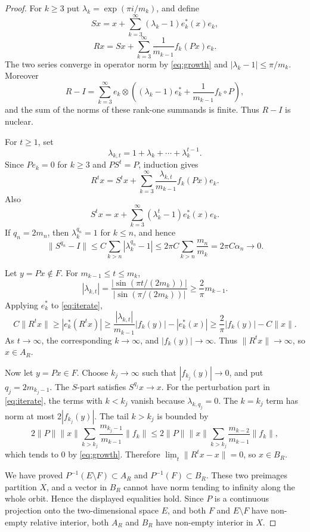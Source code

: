 \documentclass[11pt]{article}
\newcommand{\liminfn}{\underline{\lim}}
\begin{document}
\begin{proof}
For \(k\ge 3\) put \(\lambda_k=\exp(\pi i/m_k)\), and define
\[
  Sx=x+\sum_{k=3}^\infty (\lambda_k-1)e_k^*(x)e_k,
\]
\[
  Rx=Sx+\sum_{k=3}^\infty \frac{1}{m_{k-1}}f_k(Px)e_k .
\]
The two series converge in operator norm by \eqref{eq:growth} and
\(|\lambda_k-1|\le \pi/m_k\).  Moreover
\[
  R-I=\sum_{k=3}^\infty
  e_k\otimes\left((\lambda_k-1)e_k^*+\frac{1}{m_{k-1}}f_k\circ P\right),
\]
and the sum of the norms of these rank-one summands is finite.  Thus
\(R-I\) is nuclear.

For \(t\ge 1\), set
\[
  \lambda_{k,t}=1+\lambda_k+\cdots+\lambda_k^{t-1}.
\]
Since \(Pe_k=0\) for \(k\ge 3\) and \(PS^t=P\), induction gives
\begin{equation}\label{eq:iterate}
  R^t x=S^t x+\sum_{k=3}^\infty
        \frac{\lambda_{k,t}}{m_{k-1}}f_k(Px)e_k .
\end{equation}
Also
\[
  S^t x=x+\sum_{k=3}^\infty(\lambda_k^t-1)e_k^*(x)e_k .
\]
If \(q_n=2m_n\), then \(\lambda_k^{q_n}=1\) for \(k\le n\), and hence
\[
  \|S^{q_n}-I\|
  \le C\sum_{k>n}|\lambda_k^{q_n}-1|
  \le 2\pi C\sum_{k>n}\frac{m_n}{m_k}
  =2\pi C\alpha_n\to0 .
\]

Let \(y=Px\notin F\).  For \(m_{k-1}\le t\le m_k\),
\[
  |\lambda_{k,t}|
  =\frac{|\sin(\pi t/(2m_k))|}{|\sin(\pi/(2m_k))|}
  \ge \frac{2}{\pi}m_{k-1}.
\]
Applying \(e_k^*\) to \eqref{eq:iterate},
\[
  C\|R^t x\|
  \ge |e_k^*(R^t x)|
  \ge \frac{|\lambda_{k,t}|}{m_{k-1}}|f_k(y)|-|e_k^*(x)|
  \ge \frac{2}{\pi}|f_k(y)|-C\|x\|.
\]
As \(t\to\infty\), the corresponding \(k\to\infty\), and
\(|f_k(y)|\to\infty\).  Thus \(\|R^t x\|\to\infty\), so \(x\in A_R\).

Now let \(y=Px\in F\).  Choose \(k_j\to\infty\) such that
\(|f_{k_j}(y)|\to0\), and put \(q_j=2m_{k_j-1}\).  The \(S\)-part satisfies
\(S^{q_j}x\to x\).  For the perturbation part in \eqref{eq:iterate}, the
terms with \(k<k_j\) vanish because \(\lambda_{k,q_j}=0\).  The \(k=k_j\)
term has norm at most \(2|f_{k_j}(y)|\).  The tail \(k>k_j\) is bounded by
\[
  2\|P\|\|x\|\sum_{k>k_j}\frac{m_{k_j-1}}{m_{k-1}}\|f_k\|
  \le
  2\|P\|\|x\|\sum_{k>k_j}\frac{m_{k-2}}{m_{k-1}}\|f_k\|,
\]
which tends to \(0\) by \eqref{eq:growth}.  Therefore
\(\liminfn_t\|R^t x-x\|=0\), so \(x\in B_R\).

We have proved \(P^{-1}(E\setminus F)\subset A_R\) and
\(P^{-1}(F)\subset B_R\).  These two preimages partition \(X\), and a vector
in \(B_R\) cannot have norm tending to infinity along the whole orbit.  Hence
the displayed equalities hold.  Since \(P\) is a continuous projection onto
the two-dimensional space \(E\), and both \(F\) and \(E\setminus F\) have
non-empty relative interior, both \(A_R\) and \(B_R\) have non-empty interior
in \(X\).
\end{proof}
\end{document}
